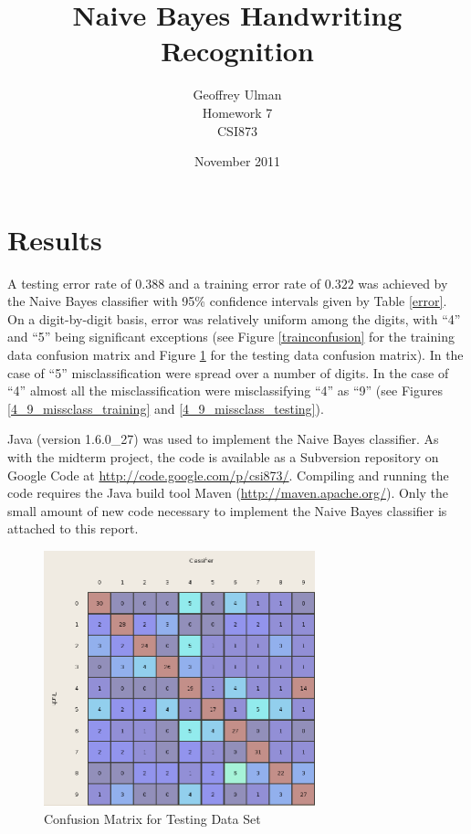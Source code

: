 \documentclass{article}
\begin{document}
\title{Naive Bayes Handwriting Recognition}
\author{Geoffrey Ulman\\
        Homework 7\\
        CSI873}
\date{November 2011}
\maketitle

\section{Results}\label{Results}

A testing error rate of \(0.388\) and a training error rate of \(0.322\) was achieved by the Naive Bayes classifier with 95\% confidence intervals given by Table \ref{error}. On a digit-by-digit basis, error was relatively uniform among the digits, with ``4'' and ``5'' being significant exceptions (see Figure \ref{trainconfusion} for the training data confusion matrix and Figure \ref{testconfusion} for the testing data confusion matrix). In the case of ``5'' misclassification were spread over a number of digits. In the case of ``4'' almost all the misclassification were misclassifying ``4'' as ``9'' (see Figures \ref{4_9_missclass_training} and \ref{4_9_missclass_testing}).

Java (version 1.6.0\_27) was used to implement the Naive Bayes classifier. As with the midterm project, the code is available as a Subversion repository on Google Code at \url{http://code.google.com/p/csi873/}. Compiling and running the code requires the Java build tool Maven (\url{http://maven.apache.org/}). Only the small amount of new code necessary to implement the Naive Bayes classifier is attached to this report.

\begin{figure}
\centering
\includegraphics[width=0.7\textwidth]{ConfusionMatrixTesting.png}
\caption{Confusion Matrix for Testing Data Set}
\label{testconfusion}
\end{figure}
\end{document}
